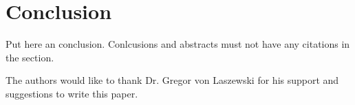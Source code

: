\section{Conclusion}

Put here an conclusion. Conlcusions and abstracts must not have any
citations in the section.


\begin{acks}

  The authors would like to thank Dr. Gregor von Laszewski for his
  support and suggestions to write this paper.

\end{acks}


 

\appendix
